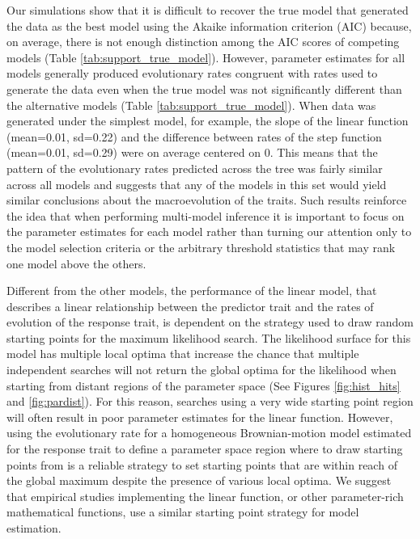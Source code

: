 Our simulations show that it is difficult to recover the true model that generated the data as the best model using the Akaike information criterion (AIC) because, on average, there is not enough distinction among the AIC scores of competing models (Table \ref{tab:support_true_model}). However, parameter estimates for all models generally produced evolutionary rates congruent with rates used to generate the data even when the true model was not significantly different than the alternative models (Table \ref{tab:support_true_model}). When data was generated under the simplest model, for example, the slope of the linear function (mean=0.01, sd=0.22) and the difference between rates of the step function (mean=0.01, sd=0.29) were on average centered on 0. This means that the pattern of the evolutionary rates predicted across the tree was fairly similar across all models and suggests that any of the models in this set would yield similar conclusions about the macroevolution of the traits. Such results reinforce the idea that when performing multi-model inference it is important to focus on the parameter estimates for each model rather than turning our attention only to the model selection criteria or the arbitrary threshold statistics that may rank one model above the others.

Different from the other models, the performance of the linear model, that describes a linear relationship between the predictor trait and the rates of evolution of the response trait, is dependent on the strategy used to draw random starting points for the maximum likelihood search. The likelihood surface for this model has multiple local optima that increase the chance that multiple independent searches will not return the global optima for the likelihood when starting from distant regions of the parameter space (See Figures \ref{fig:hist_hits} and \ref{fig:pardist}). For this reason, searches using a very wide starting point region will often result in poor parameter estimates for the linear function. However, using the evolutionary rate for a homogeneous Brownian-motion model estimated for the response trait to define a parameter space region where to draw starting points from is a reliable strategy to set starting points that are within reach of the global maximum despite the presence of various local optima. We suggest that empirical studies implementing the linear function, or other parameter-rich mathematical functions, use a similar starting point strategy for model estimation.

